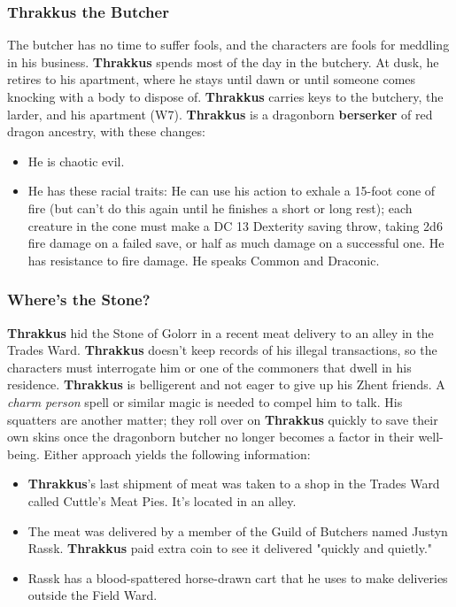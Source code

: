 \documentclass[10pt,a4paper,twoside,twocolumn,openany,nodeprecatedcode]{dndbook}
\begin{document}
\subsubsection{Thrakkus the Butcher}
The butcher has no time to suffer fools, and the characters are fools for meddling in his business. \textbf{Thrakkus} spends most of the day in the butchery. At dusk, he retires to his apartment, where he stays until dawn or until someone comes knocking with a body to dispose of. \textbf{Thrakkus} carries keys to the butchery, the larder, and his apartment (W7).
\textbf{Thrakkus} is a dragonborn \textbf{berserker} of red dragon ancestry, with these changes:
\begin{itemize}

\item He is chaotic evil.
\item He has these racial traits: He can use his action to exhale a 15-foot cone of fire (but can't do this again until he finishes a short or long rest); each creature in the cone must make a DC 13 Dexterity saving throw, taking 2d6 fire damage on a failed save, or half as much damage on a successful one. He has resistance to fire damage. He speaks Common and Draconic.
\end{itemize}


\subsubsection{Where's the Stone?}
\textbf{Thrakkus} hid the Stone of Golorr in a recent meat delivery to an alley in the Trades Ward. \textbf{Thrakkus} doesn't keep records of his illegal transactions, so the characters must interrogate him or one of the commoners that dwell in his residence.
\textbf{Thrakkus} is belligerent and not eager to give up his Zhent friends. A \textit{charm person} spell or similar magic is needed to compel him to talk. His squatters are another matter; they roll over on \textbf{Thrakkus} quickly to save their own skins once the dragonborn butcher no longer becomes a factor in their well-being. Either approach yields the following information:
\begin{itemize}

\item \textbf{Thrakkus}'s last shipment of meat was taken to a shop in the Trades Ward called Cuttle's Meat Pies. It's located in an alley.
\item The meat was delivered by a member of the Guild of Butchers named Justyn Rassk. \textbf{Thrakkus} paid extra coin to see it delivered "quickly and quietly."
\item Rassk has a blood-spattered horse-drawn cart that he uses to make deliveries outside the Field Ward.
\end{itemize}
\end{document}
